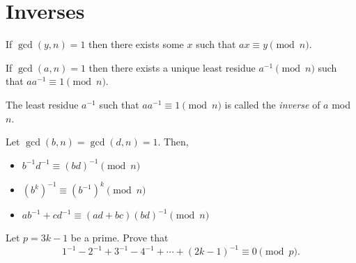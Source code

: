 \section{Inverses}
\begin{result}{\label{r:n:n:i:1}}
    If $\gcd(y,n)=1$ then there exists some $x$ such that $ax\equiv y\pmod n$.
\end{result}
\begin{result}{\label{r:n:n:i:2}}
    If $\gcd(a,n)=1$ then there exists a unique least residue $a^{-1}\pmod n$
    such that $aa^{-1}\equiv 1\pmod n$.
\end{result}
The least residue $a^{-1}$ such that $aa^{-1}\equiv 1\pmod n$ is called the \emph{inverse} of
  $a$ mod $n$.
\begin{result}{\label{r:n:n:i:3}}
  Let $\gcd(b,n)=\gcd(d,n)=1$. Then,
  \begin{itemize}
    \item $b^{-1}d^{-1}\equiv (bd)^{-1}\pmod n$
    \item $(b^k)^{-1}\equiv (b^{-1})^k\pmod n$
    \item $ab^{-1}+cd^{-1}\equiv (ad+bc)(bd)^{-1}\pmod n$
  \end{itemize}
\end{result}
\begin{problem}{\label{p:n:n:i:1}}
  Let $p=3k-1$ be a prime. Prove that
    \[1^{-1}-2^{-1}+3^{-1}-4^{-1}+\cdots+(2k-1)^{-1}\equiv 0\pmod p.\]
\end{problem}
